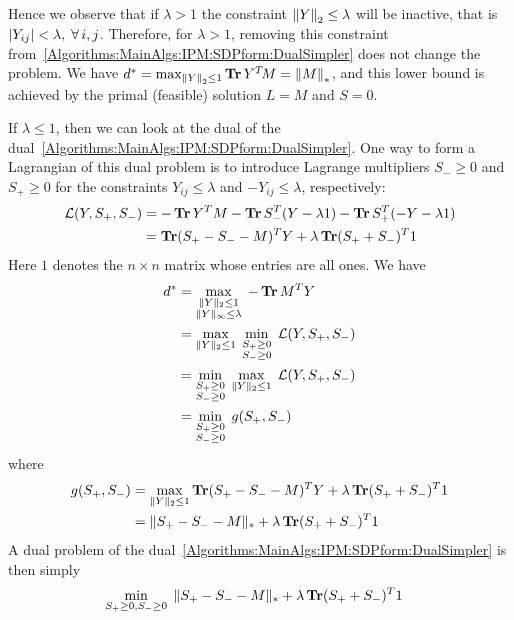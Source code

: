 Hence we observe that if $\lambda >1$ the constraint ${\left\|Y\right\|}_{2}^{} \leq \lambda$ will be inactive, that is $|Y_{ij}|<\lambda,\;{\forall \,} i,j$. Therefore, for $\lambda > 1$, removing this constraint from~\eqref{Algorithms:MainAlgs:IPM:SDPform:DualSimpler} does not change the problem. We have $d^* = \max_{{\left\|Y\right\|}_{2}^{}\leq 1} \operatorname{\mathbf{Tr}} Y^T\!M = {\left\|M\right\|}_{*}^{}$, and this lower bound is achieved by the primal (feasible) solution $L=M$ and $S =0$.

If $\lambda \leq 1$, then we can look at the dual of the dual~\eqref{Algorithms:MainAlgs:IPM:SDPform:DualSimpler}. One way to form a Lagrangian of this dual problem is to introduce Lagrange multipliers $S_- \geq 0$ and $S_+ \geq 0$ for the constraints $Y_{ij} \leq \lambda$ and $-Y_{ij} \leq \lambda$, respectively:
\begin{align*}
\mathcal{L}(Y, S_+, S_-) 
&= -\operatorname{\mathbf{Tr}} Y^T M - \operatorname{\mathbf{Tr}} S_-^T(Y - \lambda 1) - \operatorname{\mathbf{Tr}} S_+^T(-Y - \lambda 1) \\
&= \operatorname{\mathbf{Tr}} (S_+ - S_- - M)^T Y + \lambda \operatorname{\mathbf{Tr}} (S_+ + S_-)^T 1
\end{align*}
Here $1$ denotes the $n \times n$ matrix whose entries are all ones. We have
\begin{align*}
d^*
&= \max_{\substack{\|Y\|_2 \leq 1 \\ \|Y\|_\infty \leq \lambda}}\; -\operatorname{\mathbf{Tr}} M^T Y\\
&= \max_{\|Y\|_2 \leq 1}\; \min_{\substack{S_+ \geq 0 \\ S_- \geq 0}}\; \mathcal{L}(Y, S_+, S_-) \\
&= \min_{\substack{S_+ \geq 0 \\ S_- \geq 0}}\; \max_{\|Y\|_2 \leq 1}\;  \mathcal{L}(Y, S_+, S_-) \\
&= \min_{\substack{S_+ \geq 0 \\ S_- \geq 0}}\; g(S_+, S_-)
\end{align*}
where 
\begin{align*}
g(S_+, S_-) 
&= \max_{\|Y\|_2 \leq 1} \operatorname{\mathbf{Tr}} (S_+ - S_- - M)^T Y + \lambda \operatorname{\mathbf{Tr}} (S_+ + S_-)^T 1 \\
&= \|S_+ - S_- - M\|_* + \lambda \operatorname{\mathbf{Tr}} (S_+ + S_-)^T 1
\end{align*}
A dual problem of the dual~\eqref{Algorithms:MainAlgs:IPM:SDPform:DualSimpler} is then simply
\begin{align}
&\min_{S_+\geq 0, S_-\geq 0}\; \|S_+ - S_- - M\|_* + \lambda \operatorname{\mathbf{Tr}} (S_+ + S_-)^T 1
\end{align}


